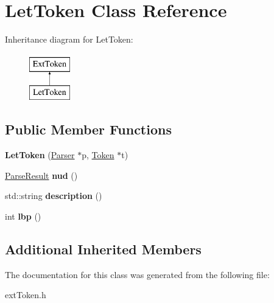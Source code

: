 \hypertarget{classLetToken}{\section{Let\-Token Class Reference}
\label{classLetToken}
}
Inheritance diagram for Let\-Token\-:\begin{figure}[H]
\begin{center}
\leavevmode
\includegraphics[height=2.000000cm]{classLetToken}
\end{center}
\end{figure}
\subsection*{Public Member Functions}
\begin{DoxyCompactItemize}
\item 
\hypertarget{classLetToken_a94651a82207e47cd2c1066a58cb1fe08}{{\bfseries Let\-Token} (\hyperlink{classParser}{Parser} $\ast$p, \hyperlink{classToken}{Token} $\ast$t)}\label{classLetToken_a94651a82207e47cd2c1066a58cb1fe08}

\item 
\hypertarget{classLetToken_a14df948cdf775bde8392bf58d53b91f3}{\hyperlink{classParseResult}{Parse\-Result} {\bfseries nud} ()}\label{classLetToken_a14df948cdf775bde8392bf58d53b91f3}

\item 
\hypertarget{classLetToken_a2c5ba0489774bf6468a26f4e19d7fab4}{std\-::string {\bfseries description} ()}\label{classLetToken_a2c5ba0489774bf6468a26f4e19d7fab4}

\item 
\hypertarget{classLetToken_a2a5ab5bc5897340513480c162bb2b065}{int {\bfseries lbp} ()}\label{classLetToken_a2a5ab5bc5897340513480c162bb2b065}

\end{DoxyCompactItemize}
\subsection*{Additional Inherited Members}


The documentation for this class was generated from the following file\-:\begin{DoxyCompactItemize}
\item 
ext\-Token.\-h\end{DoxyCompactItemize}
